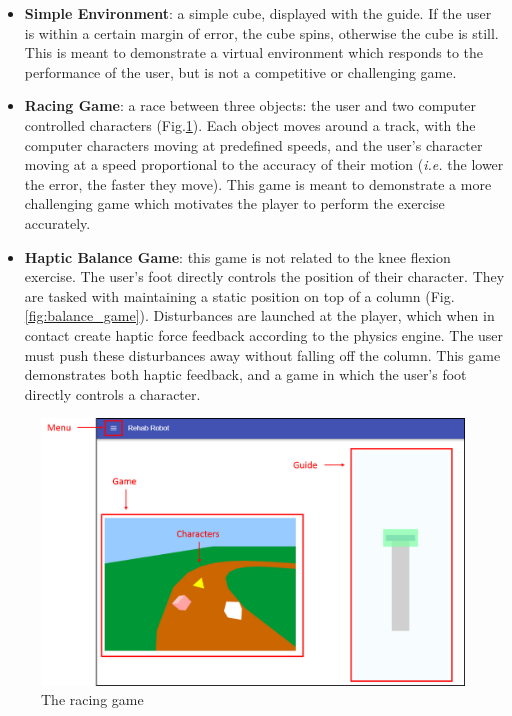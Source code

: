 \documentclass[12pt]{report}
\begin{document}
\begin{itemize}

\item \textbf{Simple Environment}: a simple cube, displayed with the guide. If the user is within a certain margin of error, the cube spins, otherwise the cube is still. This is meant to demonstrate a virtual environment which responds to the performance of the user, but is not a competitive or challenging game. 

\item \textbf{Racing Game}: a race between three objects: the user and two computer controlled characters (Fig.\ref{fig:race}). Each object moves around a track, with the computer characters moving at predefined speeds, and the user's character moving at a speed proportional to the accuracy of their motion (\textit{i.e.} the lower the error, the faster they move). This game is meant to demonstrate a more challenging game which motivates the player to perform the exercise accurately. 

\item \textbf{Haptic Balance Game}: this game is not related to the knee flexion exercise. The user's foot directly controls the position of their character. They are tasked with maintaining a static position on top of a column (Fig.\ref{fig:balance_game}). Disturbances are launched at the player, which when in contact create haptic force feedback according to the physics engine. The user must push these disturbances away without falling off the column. This game demonstrates both haptic feedback, and a game in which the user's foot directly controls a character. 


\end{itemize}	
	
	 
	
	

	
	\begin{figure}[h] 
		\centering
		\includegraphics[width=\linewidth]{UI_game_label}
		\caption{The racing game}
		\label{fig:race}
	\end{figure} 
	
\end{document}
